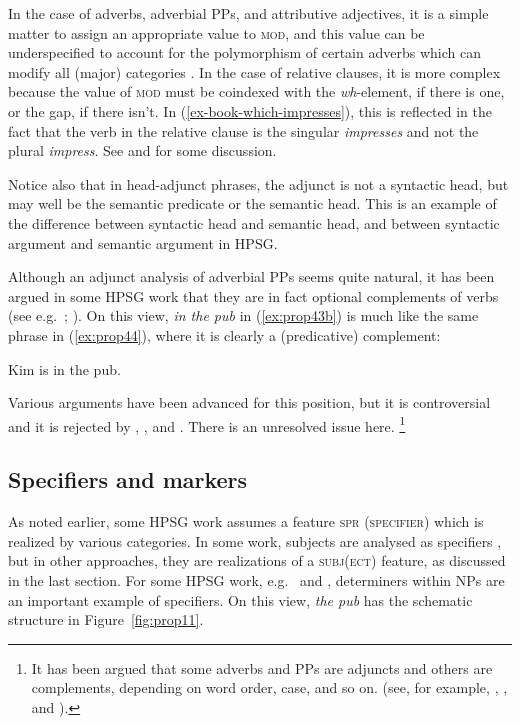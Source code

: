 \documentclass[output=paper
	        ,collection
	        ,collectionchapter
 	        ,biblatex
                ,babelshorthands
                ,newtxmath
                ,draftmode
                ,colorlinks, citecolor=brown
]{langscibook}
\begin{document}
In the case of adverbs, adverbial PPs, and attributive adjectives, it is a simple matter to assign
an appropriate value to \textsc{mod}, and this value can be underspecified to account for the
polymorphism of certain adverbs which can modify all (major) categories
\citep[--29]{AG2003b-u}. In the case of relative clauses, it is more complex because the value of
\textsc{mod} must be coindexed with the \emph{wh}-element, if there is one, or the gap, if there
isn’t. In (\ref{ex-book-which-impresses}), this is reflected in the fact that the verb in the
relative clause is the singular \emph{impresses} and not the plural \emph{impress}. See
 and  for some discussion. 

Notice also that in head-adjunct phrases, the adjunct is not a syntactic head, but may well be the semantic predicate or the semantic head. This is an example of the difference between syntactic head and semantic head, and between syntactic argument and semantic argument in HPSG.

Although an adjunct analysis of adverbial PPs seems quite natural, it has been argued in some HPSG work that they are in fact optional complements of verbs (see e.g.\ \citealp[4]{AG97a-u,BMS2001a}; \citealp[168, Footnote~2]{GSag2000a-u}). On this view, \emph{in the pub} in (\ref{ex:prop43b}) is much like the same phrase in (\ref{ex:prop44}), where it is clearly a (predicative) complement:

\ea\label{ex:prop44}
Kim is in the pub. 
\z

\noindent
Various arguments have been advanced for this position, but it is controversial and it is rejected by \citet{Levine2003a}, \citet[Chapter~3]{LH2006a}, and \citet{Chaves2009a}. There is an unresolved issue here.%
%
\footnote{It has been argued that some adverbs and PPs are adjuncts and others are complements, depending on word order, case, and so on. (see, for example, \citealp{Prze99}, \citealp{HA2014a-u}, and ).}
%

\subsection{Specifiers and markers}\label{sec:prop6.2}

As noted earlier, some HPSG work assumes a feature \textsc{spr (specifier)} which is realized by various categories. In some work, subjects are analysed as specifiers \citep*[100--103]{SWB2003a}, but in other approaches, they are realizations of a \textsc{subj(ect)} feature, as discussed in the last section. For some HPSG work, e.g.\  and , determiners within NPs are an important example of specifiers. On this view, \emph{the pub} has the schematic structure in Figure~\ref{fig:prop11}.
\end{document}
